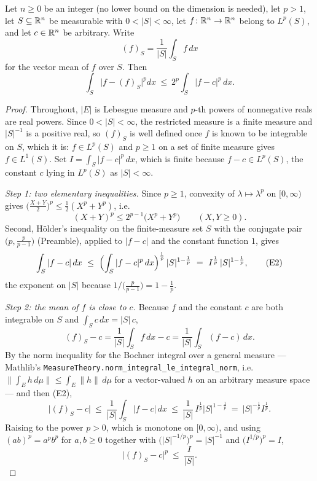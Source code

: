 \begin{helper}
Let $n\ge0$ be an integer (no lower bound on the dimension is needed), let
$p>1$, let $S\subseteq\mathbb{R}^n$ be measurable with $0<|S|<\infty$, let
$f\colon\mathbb{R}^n\to\mathbb{R}^n$ belong to $L^p(S)$, and let $c\in\mathbb{R}^n$ be arbitrary.  Write
\[
(f)_S=\frac1{|S|}\int_Sf\,dx
\]
for the vector mean of $f$ over $S$.  Then
\[
\int_S\bigl|f-(f)_S\bigr|^p dx\ \le\ 2^{p}\int_S|f-c|^p\,dx .
\tag{M}
\]
\end{helper}
\begin{proof}
Throughout, $|E|$ is Lebesgue measure and $p$-th powers of nonnegative reals are
real powers.  Since $0<|S|<\infty$, the restricted measure is a finite measure
and $|S|^{-1}$ is a positive real, so $(f)_S$ is well defined once $f$ is known
to be integrable on $S$, which it is: $f\in L^p(S)$ and $p\ge1$ on a set of
finite measure gives $f\in L^1(S)$.  Set $I=\int_S|f-c|^p\,dx$, which is finite
because $f-c\in L^p(S)$, the constant $c$ lying in $L^p(S)$ as $|S|<\infty$.

\emph{Step 1: two elementary inequalities.}  Since $p\ge1$, convexity of
$\lambda\mapsto\lambda^{p}$ on $[0,\infty)$ gives
$\bigl(\frac{X+Y}2\bigr)^{p}\le\frac12(X^{p}+Y^{p})$, i.e.
\[
(X+Y)^{p}\le2^{p-1}\bigl(X^{p}+Y^{p}\bigr)\qquad(X,Y\ge0).
\tag{E1}
\]
Second, H\"older's inequality on the finite-measure set $S$ with the conjugate
pair $\bigl(p,\frac p{p-1}\bigr)$ (Preamble), applied to $|f-c|$ and the
constant function $1$, gives
\[
\int_S|f-c|\,dx\ \le\ \Bigl(\int_S|f-c|^p\,dx\Bigr)^{\frac1p}\,|S|^{1-\frac1p}
\ =\ I^{\frac1p}\,|S|^{1-\frac1p},
\tag{E2}
\]
the exponent on $|S|$ because $1/\bigl(\frac p{p-1}\bigr)=1-\frac1p$.

\emph{Step 2: the mean of $f$ is close to $c$.}  Because $f$ and the constant
$c$ are both integrable on $S$ and $\int_Sc\,dx=|S|\,c$,
\[
(f)_S-c=\frac1{|S|}\int_Sf\,dx-c=\frac1{|S|}\int_S(f-c)\,dx .
\]
By the norm inequality for the Bochner integral over a general measure ---
Mathlib's \texttt{MeasureTheory.norm\_integral\_le\_integral\_norm}, i.e.\
$\bigl\|\int_Eh\,d\mu\bigr\|\le\int_E\|h\|\,d\mu$ for a vector-valued $h$ on an
arbitrary measure space --- and then (E2),
\[
\bigl|(f)_S-c\bigr|\ \le\ \frac1{|S|}\int_S|f-c|\,dx
\ \le\ \frac1{|S|}\,I^{\frac1p}|S|^{1-\frac1p}
\ =\ |S|^{-\frac1p}I^{\frac1p}.
\]
Raising to the power $p>0$, which is monotone on $[0,\infty)$, and using
$(ab)^p=a^pb^p$ for $a,b\ge0$ together with
$\bigl(|S|^{-1/p}\bigr)^p=|S|^{-1}$ and $\bigl(I^{1/p}\bigr)^p=I$,
\[
\bigl|(f)_S-c\bigr|^{p}\ \le\ \frac I{|S|}.
\tag{M1}
\]


\end{proof}
